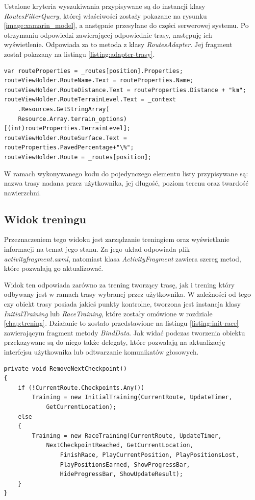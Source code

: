 Ustalone kryteria wyszukiwania przypisywane są do instancji klasy \textit{RoutesFilterQuery}, której właściwości zostały pokazane na rysunku \ref{image:xamarin_model}, a następnie przesyłane do części serwerowej systemu. Po otrzymaniu odpowiedzi zawierającej odpowiednie trasy, następuję ich wyświetlenie. Odpowiada za to metoda z klasy \textit{RoutesAdapter}. Jej fragment został pokazany na listingu \ref{listing:adapter-trasy}.
\begin{lstlisting}[caption={Przypisanie cech trasy do elementu listy},label=listing:adapter-trasy]
var routeProperties = _routes[position].Properties;
routeViewHolder.RouteName.Text = routeProperties.Name;
routeViewHolder.RouteDistance.Text = routeProperties.Distance + "km";
routeViewHolder.RouteTerrainLevel.Text = _context
	.Resources.GetStringArray(
	Resource.Array.terrain_options)[(int)routeProperties.TerrainLevel];
routeViewHolder.RouteSurface.Text = routeProperties.PavedPercentage+"\%";
routeViewHolder.Route = _routes[position];
\end{lstlisting}
W ramach wykonywanego kodu do pojedynczego elementu listy przypisywane są: nazwa trasy nadana przez użytkownika, jej długość, poziom terenu oraz twardość nawierzchni.

\subsection{Widok treningu}
Przeznaczeniem tego widoku jest zarządzanie treningiem oraz wyświetlanie informacji na temat jego stanu. Za jego układ odpowiada plik \textit{activity\textunderscore fragment.axml}, natomiast klasa \textit{ActivityFragment} zawiera szereg metod, które pozwalają go aktualizować.

Widok ten odpowiada zarówno za trening tworzący trasę, jak i trening który odbywany jest w ramach trasy wybranej przez użytkownika. W zależności od tego czy obiekt trasy posiada jakieś punkty kontrolne, tworzona jest instancja klasy \textit{InitialTraining} lub \textit{RaceTraining}, które zostały omówione w rozdziale \ref{chap:trening}. Działanie to zostało przedstawione na listingu \ref{listing:init-race} zawierającym fragment metody \textit{BindData}. Jak widać podczas tworzenia obiektu przekazywane są do niego także delegaty, które pozwalają na aktualizację interfejsu użytkownika lub odtwarzanie komunikatów głosowych.
\begin{lstlisting}[caption={Utworzenie obiektu zawierającego logikę treningu},label=listing:init-race]
private void RemoveNextCheckpoint()
{
	if (!CurrentRoute.Checkpoints.Any())
	    Training = new InitialTraining(CurrentRoute, UpdateTimer,
	    	GetCurrentLocation);
	else
	{
	    Training = new RaceTraining(CurrentRoute, UpdateTimer,
	    	NextCheckpointReached, GetCurrentLocation, 
      	    	FinishRace, PlayCurrentPosition, PlayPositionsLost,
      	    	PlayPositionsEarned, ShowProgressBar,
      	    	HideProgressBar, ShowUpdateResult);
	}
}
\end{lstlisting}
